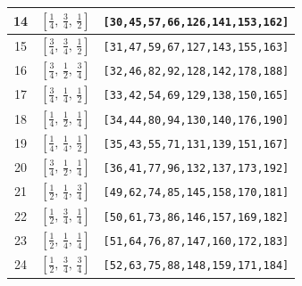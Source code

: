 \documentclass[fleqn,8pt]{jsarticle}
\begin{document}
\begin{longtable}{ccc}
14 & $\left[ \frac{1}{4},\, \frac{3}{4},\, \frac{1}{2} \right]$ & {\tt [30,45,57,66,126,141,153,162]} \\ \hline
15 & $\left[ \frac{3}{4},\, \frac{3}{4},\, \frac{1}{2} \right]$ & {\tt [31,47,59,67,127,143,155,163]} \\ \hline
16 & $\left[ \frac{3}{4},\, \frac{1}{2},\, \frac{3}{4} \right]$ & {\tt [32,46,82,92,128,142,178,188]} \\ \hline
17 & $\left[ \frac{3}{4},\, \frac{1}{4},\, \frac{1}{2} \right]$ & {\tt [33,42,54,69,129,138,150,165]} \\ \hline
18 & $\left[ \frac{1}{4},\, \frac{1}{2},\, \frac{1}{4} \right]$ & {\tt [34,44,80,94,130,140,176,190]} \\ \hline
19 & $\left[ \frac{1}{4},\, \frac{1}{4},\, \frac{1}{2} \right]$ & {\tt [35,43,55,71,131,139,151,167]} \\ \hline
20 & $\left[ \frac{3}{4},\, \frac{1}{2},\, \frac{1}{4} \right]$ & {\tt [36,41,77,96,132,137,173,192]} \\ \hline
21 & $\left[ \frac{1}{2},\, \frac{1}{4},\, \frac{3}{4} \right]$ & {\tt [49,62,74,85,145,158,170,181]} \\ \hline
22 & $\left[ \frac{1}{2},\, \frac{3}{4},\, \frac{1}{4} \right]$ & {\tt [50,61,73,86,146,157,169,182]} \\ \hline
23 & $\left[ \frac{1}{2},\, \frac{1}{4},\, \frac{1}{4} \right]$ & {\tt [51,64,76,87,147,160,172,183]} \\ \hline
24 & $\left[ \frac{1}{2},\, \frac{3}{4},\, \frac{3}{4} \right]$ & {\tt [52,63,75,88,148,159,171,184]} \\
\end{longtable}
\renewcommand{\arraystretch}{1.2}
\end{document}
